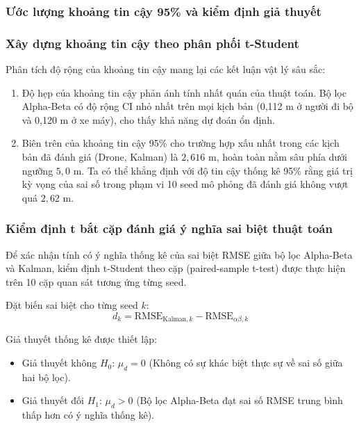 \subsubsection{Ước lượng khoảng tin cậy 95\% và kiểm định giả thuyết}

\subsubsection{Xây dựng khoảng tin cậy theo phân phối t-Student}

Phân tích độ rộng của khoảng tin cậy mang lại các kết luận vật lý sâu sắc:
\begin{enumerate}
    \item Độ hẹp của khoảng tin cậy phản ánh tính nhất quán của thuật toán. Bộ lọc Alpha-Beta có độ rộng CI nhỏ nhất trên mọi kịch bản (0,112 m ở người đi bộ và 0,120 m ở xe máy), cho thấy khả năng dự đoán ổn định.
    \item Biên trên của khoảng tin cậy 95\% cho trường hợp xấu nhất trong các kịch bản đã đánh giá (Drone, Kalman) là $2{,}616$ m, hoàn toàn nằm sâu phía dưới ngưỡng $5{,}0$ m. Ta có thể khẳng định với độ tin cậy thống kê 95\% rằng giá trị kỳ vọng của sai số trong phạm vi 10 seed mô phỏng đã đánh giá không vượt quá $2{,}62$ m.
\end{enumerate}

\subsubsection{Kiểm định t bắt cặp đánh giá ý nghĩa sai biệt thuật toán}

\hspace{0.5cm} Để xác nhận tính có ý nghĩa thống kê của sai biệt RMSE giữa bộ lọc Alpha-Beta và Kalman, kiểm định t-Student theo cặp (paired-sample t-test) được thực hiện trên 10 cặp quan sát tương ứng từng seed.

Đặt biến sai biệt cho từng seed $k$:
\begin{equation}
d_k = \text{RMSE}_{\text{Kalman}, k} - \text{RMSE}_{\alpha\beta, k}
\label{eq:paired-diff}
\end{equation}

Giả thuyết thống kê được thiết lập:
\begin{itemize}
    \item Giả thuyết không $H_0$: $\mu_d = 0$ (Không có sự khác biệt thực sự về sai số giữa hai bộ lọc).
    \item Giả thuyết đối $H_1$: $\mu_d > 0$ (Bộ lọc Alpha-Beta đạt sai số RMSE trung bình thấp hơn có ý nghĩa thống kê).
\end{itemize}


